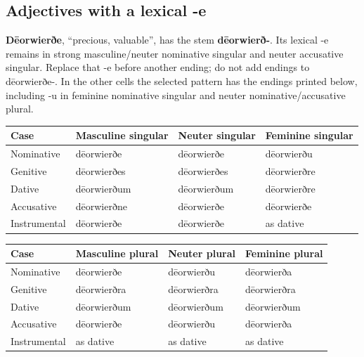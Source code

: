 \subsection*{Adjectives with a lexical -e}

\textbf{Dēorwierðe}, “precious, valuable”, has the stem \textbf{dēorwierð-}. Its lexical -e remains in strong masculine/\allowbreak{}neuter nominative singular and neuter accusative singular. Replace that -e before another ending; do not add endings to dēorwierðe-. In the other cells the selected pattern has the endings printed below, including -u in feminine nominative singular and neuter nominative/\allowbreak{}accusative plural.

\par\begingroup
\fontsize{10.5}{13.2}\selectfont
\setlength{\LTleft}{0pt}\setlength{\LTright}{\fill}
\noindent
\begin{tabular}{@{}>{\raggedright\arraybackslash}p{22.0mm}>{\raggedright\arraybackslash}p{31.188mm}>{\raggedright\arraybackslash}p{31.188mm}>{\raggedright\arraybackslash}p{31.188mm}@{}}
\toprule
\textbf{Case} & \textbf{Masculine singular} & \textbf{Neuter singular} & \textbf{Feminine singular} \\
\midrule
Nominative & dēorwierðe & dēorwierðe & dēorwierðu \\
Genitive & dēorwierðes & dēorwierðes & dēorwierðre \\
Dative & dēorwierðum & dēorwierðum & dēorwierðre \\
Accusative & dēorwierðne & dēorwierðe & dēorwierðe \\
Instrumental & dēorwierðe & dēorwierðe & as dative \\
\bottomrule
\end{tabular}
\par\endgroup
\par\addvspace{5pt}
\par\begingroup
\fontsize{10.5}{13.2}\selectfont
\setlength{\LTleft}{0pt}\setlength{\LTright}{\fill}
\noindent
\begin{tabular}{@{}>{\raggedright\arraybackslash}p{22.0mm}>{\raggedright\arraybackslash}p{31.188mm}>{\raggedright\arraybackslash}p{31.188mm}>{\raggedright\arraybackslash}p{31.188mm}@{}}
\toprule
\textbf{Case} & \textbf{Masculine plural} & \textbf{Neuter plural} & \textbf{Feminine plural} \\
\midrule
Nominative & dēorwierðe & dēorwierðu & dēorwierða \\
Genitive & dēorwierðra & dēorwierðra & dēorwierðra \\
Dative & dēorwierðum & dēorwierðum & dēorwierðum \\
Accusative & dēorwierðe & dēorwierðu & dēorwierða \\
Instrumental & as dative & as dative & as dative \\
\bottomrule
\end{tabular}
\par\endgroup


